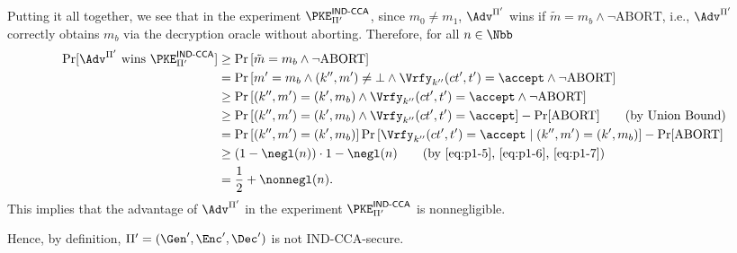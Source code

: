 \begin{answer}
        Putting it all together, we see that in the experiment  $\PKE^{\textsf{IND-CCA}}_{\Pi'}$,  since $m_0\neq m_1$, $\Adv^{\Pi'}$ wins if $\tilde{m}=m_b \land \neg \textrm{ABORT}$, i.e., $\Adv^{\Pi'}$ correctly obtains $m_b$ via the decryption oracle without aborting. Therefore, for all $n\in\Nbb$
        \begin{align*}
            \Pr[\Adv^{\Pi'} \textrm{ wins } \PKE^{\textsf{IND-CCA}}_{\Pi'}]
            &\ge \Pr\left[ \tilde{m}=m_b \land \neg \textrm{ABORT}\right]\\
            &= \Pr\left[ m'=m_b\land (k'', m')\neq \bot \land \Vrfy_{k''}(ct',t')=\accept  \land \neg\textrm{ABORT}\right]\\
            &\ge  \Pr\left[ (k'', m')=(k', m_b) \land \Vrfy_{k''}(ct',t')=\accept  \land \neg\textrm{ABORT}\right]\\
            &\ge \Pr\left[ (k'', m')=(k', m_b) \land \Vrfy_{k''}(ct',t')=\accept \right] - \Pr[\textrm{ABORT}]
            \qquad (\textrm{by Union Bound})\\
            &= \Pr\left[ (k'', m')=(k', m_b)\right] \Pr\left[\Vrfy_{k''}(ct',t')=\accept \mid  (k'', m')=(k', m_b)\right] - \Pr[\textrm{ABORT}]\\
            &\ge (1-\negl(n))\cdot 1 - \negl(n)
            \qquad \textrm{(by \eqref{eq:p1-5}, \eqref{eq:p1-6}, \eqref{eq:p1-7})}\\
            &= \frac{1}{2}+\nonnegl(n).
        \end{align*}
        This implies that the advantage of $\Adv^{\Pi'}$ in the experiment  $\PKE^{\textsf{IND-CCA}}_{\Pi'}$ is nonnegligible.

        Hence, by definition, $\Pi'=(\Gen', \Enc', \Dec')$ is not IND-CCA-secure.
\end{answer}